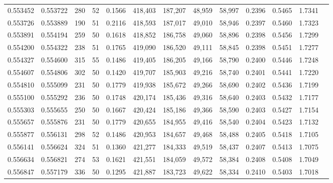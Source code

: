 \begin{tabular}{rrrrrrrrrrrrr}
0.553452 & 0.553722 &   280 &  52 &                                     0.1566 & 418,403 & 187,207 &  48,959 &  58,997 & 0.2396 & 0.5465 & 1.7341 \\
0.553726 & 0.553889 &   190 &  51 &                                     0.2116 & 418,593 & 187,017 &  49,010 &  58,946 & 0.2397 & 0.5460 & 1.7323 \\
0.553891 & 0.554194 &   259 &  50 &                                     0.1618 & 418,852 & 186,758 &  49,060 &  58,896 & 0.2398 & 0.5456 & 1.7299 \\
0.554200 & 0.554322 &   238 &  51 &                                     0.1765 & 419,090 & 186,520 &  49,111 &  58,845 & 0.2398 & 0.5451 & 1.7277 \\
0.554327 & 0.554600 &   315 &  55 &                                     0.1486 & 419,405 & 186,205 &  49,166 &  58,790 & 0.2400 & 0.5446 & 1.7248 \\
0.554607 & 0.554806 &   302 &  50 &                                     0.1420 & 419,707 & 185,903 &  49,216 &  58,740 & 0.2401 & 0.5441 & 1.7220 \\
0.554810 & 0.555099 &   231 &  50 &                                     0.1779 & 419,938 & 185,672 &  49,266 &  58,690 & 0.2402 & 0.5436 & 1.7199 \\
0.555100 & 0.555292 &   236 &  50 &                                     0.1748 & 420,174 & 185,436 &  49,316 &  58,640 & 0.2403 & 0.5432 & 1.7177 \\
0.555303 & 0.555655 &   250 &  50 &                                     0.1667 & 420,424 & 185,186 &  49,366 &  58,590 & 0.2403 & 0.5427 & 1.7154 \\
0.555657 & 0.555876 &   231 &  50 &                                     0.1779 & 420,655 & 184,955 &  49,416 &  58,540 & 0.2404 & 0.5423 & 1.7132 \\
0.555877 & 0.556131 &   298 &  52 &                                     0.1486 & 420,953 & 184,657 &  49,468 &  58,488 & 0.2405 & 0.5418 & 1.7105 \\
0.556141 & 0.556624 &   324 &  51 &                                     0.1360 & 421,277 & 184,333 &  49,519 &  58,437 & 0.2407 & 0.5413 & 1.7075 \\
0.556634 & 0.556821 &   274 &  53 &                                     0.1621 & 421,551 & 184,059 &  49,572 &  58,384 & 0.2408 & 0.5408 & 1.7049 \\
0.556847 & 0.557179 &   336 &  50 &                                     0.1295 & 421,887 & 183,723 &  49,622 &  58,334 & 0.2410 & 0.5403 & 1.7018 \\

\end{tabular}
